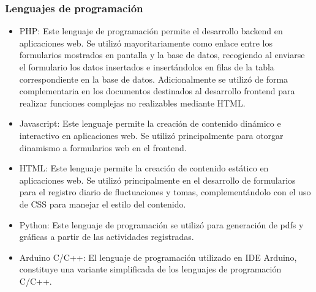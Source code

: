 \subsubsection{Lenguajes de programación}
\begin{itemize}
    \item PHP: Este lenguaje de programación permite el desarrollo backend en aplicaciones web. Se utilizó mayoritariamente como enlace entre los formularios mostrados en pantalla y la base de datos, recogiendo al enviarse el formulario los datos insertados e insertándolos en filas de la tabla correspondiente en la base de datos. Adicionalmente se utilizó de forma complementaria en los documentos destinados al desarrollo frontend para realizar funciones complejas no realizables mediante HTML.
    \item Javascript: Este lenguaje permite la creación de contenido dinámico e interactivo en aplicaciones web. Se utilizó principalmente para otorgar dinamismo a formularios web en el frontend.
    \item HTML: Este lenguaje permite la creación de contenido estático en aplicaciones web. Se utilizó principalmente en el desarrollo de formularios para el registro diario de fluctuaciones y tomas, complementándolo con el uso de CSS para manejar el estilo del contenido.
    \item Python: Este lenguaje de programación se utilizó para generación de pdfs y gráficas a partir de las actividades registradas.
    \item Arduino C/C++: El lenguaje de programación utilizado en IDE Arduino, constituye una variante simplificada de los lenguajes de programación C/C++.
\end{itemize}
